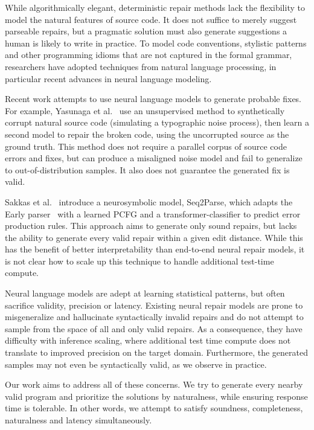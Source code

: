 While algorithmically elegant, deterministic repair methods lack the flexibility to model the natural features of source code. It does not suffice to merely suggest parseable repairs, but a pragmatic solution must also generate suggestions a human is likely to write in practice. To model code conventions, stylistic patterns and other programming idioms that are not captured in the formal grammar, researchers have adopted techniques from natural language processing, in particular recent advances in neural language modeling.

Recent work attempts to use neural language models to generate probable fixes. For example, Yasunaga et al.~\cite{yasunaga2021break} use an unsupervised method to synthetically corrupt natural source code (simulating a typographic noise process), then learn a second model to repair the broken code, using the uncorrupted source as the ground truth. This method does not require a parallel corpus of source code errors and fixes, but can produce a misaligned noise model and fail to generalize to out-of-distribution samples. It also does not guarantee the generated fix is valid.

Sakkas et al.~\cite{sakkas2022seq2parse} introduce a neurosymbolic model, Seq2Parse, which adapts the Early parser~\cite{earley1970efficient} with a learned PCFG and a transformer-classifier to predict error production rules. This approach aims to generate only sound repairs, but lacks the ability to generate every valid repair within a given edit distance. While this has the benefit of better interpretability than end-to-end neural repair models, it is not clear how to scale up this technique to handle additional test-time compute.

Neural language models are adept at learning statistical patterns, but often sacrifice validity, precision or latency. Existing neural repair models are prone to misgeneralize and hallucinate syntactically invalid repairs and do not attempt to sample from the space of all and only valid repairs. As a consequence, they have difficulty with inference scaling, where additional test time compute does not translate to improved precision on the target domain. Furthermore, the generated samples may not even be syntactically valid, as we observe in practice.

Our work aims to address all of these concerns. We try to generate every nearby valid program and prioritize the solutions by naturalness, while ensuring response time is tolerable. In other words, we attempt to satisfy soundness, completeness, naturalness and latency simultaneously.


